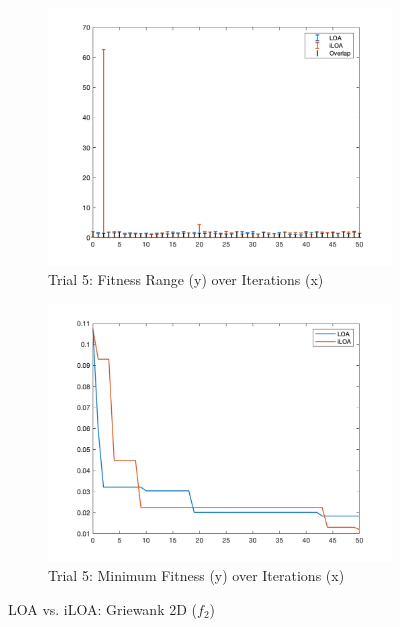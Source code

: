 \begin{figure}
  \begin{subfigure}[b]{0.4\textwidth}
    \includegraphics[width=\textwidth]{img/bars/f2/5}
    \caption{ \scriptsize Trial 5: Fitness Range (y) over Iterations (x)}
    \label{fig:f2-b-5}
  \end{subfigure}
  \begin{subfigure}[b]{0.4\textwidth}
    \includegraphics[width=\textwidth]{img/fits/f2/5}
    \caption{ \scriptsize Trial 5: Minimum Fitness (y) over Iterations (x)}
    \label{fig:f2-f-5}
  \end{subfigure}

  \caption{ \scriptsize LOA vs. iLOA: Griewank 2D ($f_2$)}
\end{figure}
